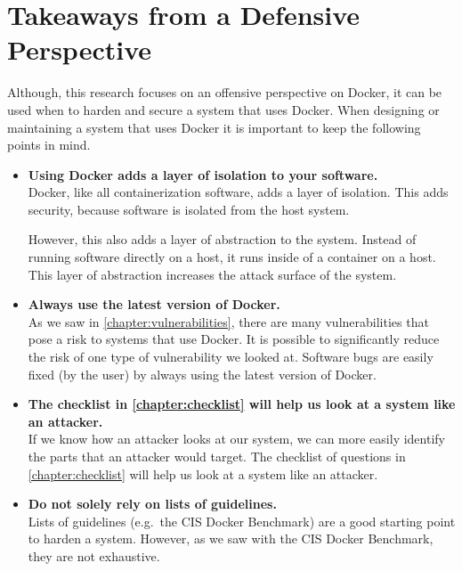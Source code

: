 \pagebreak

\section{Takeaways from a Defensive Perspective}
Although, this research focuses on an offensive perspective on Docker, it can be used when to harden and secure a system that uses Docker. When designing or maintaining a system that uses Docker it is important to keep the following points in mind.
\begin{itemize}
    \item \textbf{Using Docker adds a layer of isolation to your software.}\\
        Docker, like all containerization software, adds a layer of isolation. This adds security, because software is isolated from the host system.

    However, this also adds a layer of abstraction to the system. Instead of running software directly on a host, it runs inside of a container on a host. This layer of abstraction increases the attack surface of the system.

    \item \textbf{Always use the latest version of Docker.}\\
        As we saw in \autoref{chapter:vulnerabilities}, there are many vulnerabilities that pose a risk to systems that use Docker. It is possible to significantly reduce the risk of one type of vulnerability we looked at. Software bugs are easily fixed (by the user) by always using the latest version of Docker.

    \item \textbf{The checklist in \autoref{chapter:checklist} will help us look at a system like an attacker.}\\
        If we know how an attacker looks at our system, we can more easily identify the parts that an attacker would target. The checklist of questions in \autoref{chapter:checklist} will help us look at a system like an attacker.

    \item \textbf{Do not solely rely on lists of guidelines.}\\
        Lists of guidelines (e.g.\ the CIS Docker Benchmark) are a good starting point to harden a system. However, as we saw with the CIS Docker Benchmark, they are not exhaustive.
\end{itemize}
